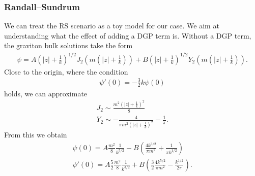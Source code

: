 \subsubsection{Randall--Sundrum}
We can treat the RS scenario as a toy model for our case. We aim at understanding what the effect of adding a DGP term is. Without a DGP term, the graviton bulk solutions take the form
\begin{align}
\psi = A \left(|z| + \frac 1 k\right)^{1/2} J_2\left( m\left(|z| + \frac 1 k\right) \right) + B \left(|z| + \frac 1 k\right)^{1/2} Y_2\left( m\left(|z| + \frac 1 k\right) \right).
\end{align}
Close to the origin, where the condition
\begin{align}
\psi'(0) = - \frac 3 2 k \psi(0)
\end{align}
holds, we can approximate
\begin{align}
J_2 \sim \frac{m^2 (|z| + \frac 1 k)^2}{8} \\
Y_2 \sim - \frac{4}{\pi m^2 (|z| + \frac 1 k)^2} - \frac 1 \pi.
\end{align}
From this we obtain
\begin{align}
\psi(0) = A \frac {m^2} 8 \frac 1 {k^{5/2}} - B \left( \frac{4 k^{3/2}}{\pi m^2} + \frac 1 {\pi k^{1/2}} \right) \\
\psi'(0) = A \frac 5 2 \frac {m^2} 8 \frac 1 {k^{3/2}} + B \left( \frac 3 2 \frac{4 k^{5/2}}{\pi m^2} - \frac {k^{1/2}}{2 \pi } \right).
\end{align}

